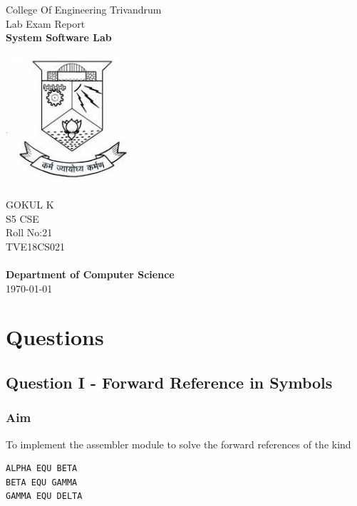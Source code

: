 \documentclass[13pt,oneside]{article}
\begin{document}

\begin{titlepage}
\begin{center}
{\LARGE College Of Engineering Trivandrum}\\[0.5cm]
{\LARGE Lab Exam Report}\\[2pt]
\linespread{1.2}\huge {\bfseries System Software Lab}\\[3cm]
\linespread{1}
\includegraphics[width=5cm]{img/emblem.jpeg}\\[3cm]
{\Large GOKUL K\\ S5  CSE \\ Roll No:21\\ TVE18CS021 }\\[1cm]


\textit{ }\\[2cm]
\textbf{Department of Computer Science}\\[0.2cm]
\today
\end{center}

\end{titlepage}

\newpage

\large
\section{Questions}
\subsection{Question I - Forward Reference in Symbols}
\subsubsection{Aim}
To implement the assembler module to solve the forward references of the kind
\begin{verbatim}
ALPHA EQU BETA
BETA EQU GAMMA
GAMMA EQU DELTA
\end{verbatim}
\end{document}

